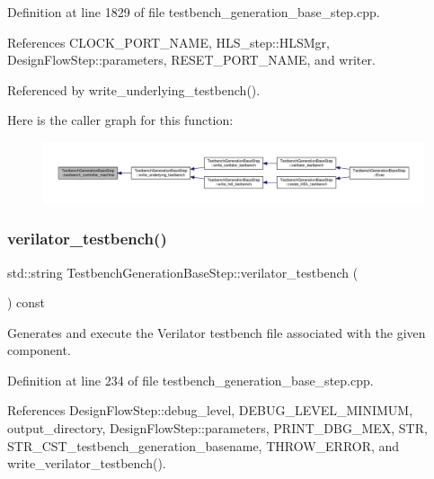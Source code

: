 Definition at line 1829 of file testbench\+\_\+generation\+\_\+base\+\_\+step.\+cpp.



References C\+L\+O\+C\+K\+\_\+\+P\+O\+R\+T\+\_\+\+N\+A\+ME, H\+L\+S\+\_\+step\+::\+H\+L\+S\+Mgr, Design\+Flow\+Step\+::parameters, R\+E\+S\+E\+T\+\_\+\+P\+O\+R\+T\+\_\+\+N\+A\+ME, and writer.



Referenced by write\+\_\+underlying\+\_\+testbench().

Here is the caller graph for this function\+:
\nopagebreak
\begin{figure}[H]
\begin{center}
\leavevmode
\includegraphics[width=350pt]{dc/d02/classTestbenchGenerationBaseStep_ababf761d897357b1854543acc24547ae_icgraph}
\end{center}
\end{figure}
\mbox{\label{classTestbenchGenerationBaseStep_a5df6c949ea78186f4c6a47f80e68aa3e}} 
\subsubsection{\texorpdfstring{verilator\+\_\+testbench()}{verilator\_testbench()}}
{\footnotesize\ttfamily std\+::string Testbench\+Generation\+Base\+Step\+::verilator\+\_\+testbench (\begin{DoxyParamCaption}{ }\end{DoxyParamCaption}) const\hspace{0.3cm}{\ttfamily [protected]}}



Generates and execute the Verilator testbench file associated with the given component. 



Definition at line 234 of file testbench\+\_\+generation\+\_\+base\+\_\+step.\+cpp.



References Design\+Flow\+Step\+::debug\+\_\+level, D\+E\+B\+U\+G\+\_\+\+L\+E\+V\+E\+L\+\_\+\+M\+I\+N\+I\+M\+UM, output\+\_\+directory, Design\+Flow\+Step\+::parameters, P\+R\+I\+N\+T\+\_\+\+D\+B\+G\+\_\+\+M\+EX, S\+TR, S\+T\+R\+\_\+\+C\+S\+T\+\_\+testbench\+\_\+generation\+\_\+basename, T\+H\+R\+O\+W\+\_\+\+E\+R\+R\+OR, and write\+\_\+verilator\+\_\+testbench().



